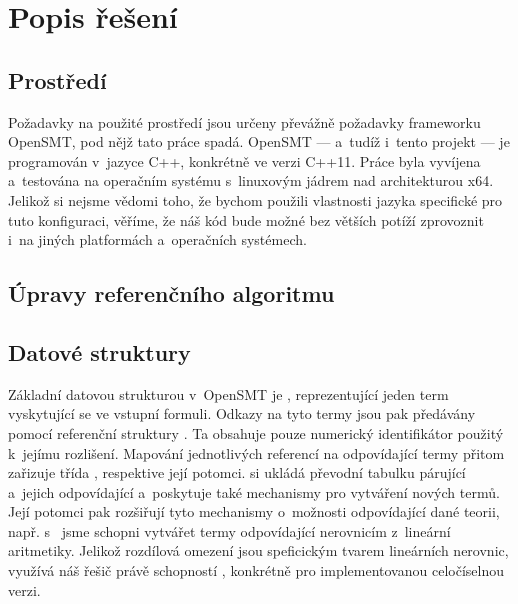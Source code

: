 \chapter{Popis řešení}

\section{Prostředí}

Požadavky na použité prostředí jsou určeny převážně požadavky frameworku OpenSMT, pod nějž tato práce spadá. OpenSMT --- a~tudíž i~tento projekt --- je programován v~jazyce C++, konkrétně ve verzi C++11. Práce byla vyvíjena a~testována na operačním systému s~linuxovým jádrem nad architekturou x64. Jelikož si nejsme vědomi toho, že bychom použili vlastnosti jazyka specifické pro tuto konfiguraci, věříme, že náš kód bude možné bez větších potíží zprovoznit i~na jiných platformách a~operačních systémech.

\section{Úpravy referenčního algoritmu}\label{upravy}


\section{Datové struktury}

Základní datovou strukturou v~OpenSMT je , reprezentující jeden term vyskytující se ve vstupní formuli. Odkazy na tyto termy jsou pak předávány pomocí referenční struktury . Ta obsahuje pouze numerický identifikátor použitý k~jejímu rozlišení. Mapování jednotlivých referencí na odpovídající termy přitom zařizuje třída , respektive její potomci.  si ukládá převodní tabulku párující  a~jejich odpovídající  a~poskytuje také mechanismy pro vytváření nových termů. Její potomci pak rozšiřují tyto mechanismy o~možnosti odpovídající dané teorii, např. s~ jsme schopni vytvářet termy odpovídající nerovnicím z~lineární aritmetiky. Jelikož rozdílová omezení jsou speficickým tvarem lineárních nerovnic, využívá náš řešič právě schopností , konkrétně  pro implementovanou celočíselnou verzi.

